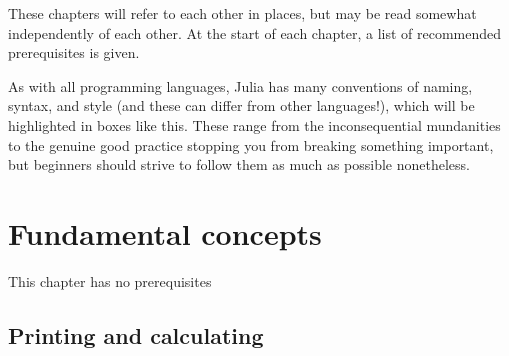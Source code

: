 \documentclass[
  letterpaper,
  DIV=11,
  numbers=noendperiod]{scrreprt}
\begin{document}
These chapters will refer to each other in places, but may be read
somewhat independently of each other. At the start of each chapter, a
list of recommended prerequisites is given.

\begin{tcolorbox}[enhanced jigsaw, toprule=.15mm, opacitybacktitle=0.6, leftrule=.75mm, breakable, coltitle=black, bottomrule=.15mm, colbacktitle=quarto-callout-tip-color!10!white, bottomtitle=1mm, rightrule=.15mm, title=\textcolor{quarto-callout-tip-color}{\faLightbulb}\hspace{0.5em}{Convention}, colframe=quarto-callout-tip-color-frame, left=2mm, colback=white, opacityback=0, arc=.35mm, toptitle=1mm, titlerule=0mm]

As with all programming languages, Julia has many conventions of naming,
syntax, and style (and these can differ from other languages!), which
will be highlighted in boxes like this. These range from the
inconsequential mundanities to the genuine good practice stopping you
from breaking something important, but beginners should strive to follow
them as much as possible nonetheless.

\end{tcolorbox}

\hypertarget{sec-fundamentals}{%
\chapter{Fundamental concepts}\label{sec-fundamentals}}

\begin{tcolorbox}[enhanced jigsaw, toprule=.15mm, opacitybacktitle=0.6, leftrule=.75mm, breakable, coltitle=black, bottomrule=.15mm, colbacktitle=quarto-callout-important-color!10!white, bottomtitle=1mm, rightrule=.15mm, title=\textcolor{quarto-callout-important-color}{\faExclamation}\hspace{0.5em}{Prerequisites}, colframe=quarto-callout-important-color-frame, left=2mm, colback=white, opacityback=0, arc=.35mm, toptitle=1mm, titlerule=0mm]

This chapter has no prerequisites

\end{tcolorbox}

\hypertarget{printing-and-calculating}{%
\section{Printing and calculating}\label{printing-and-calculating}}
\end{document}
